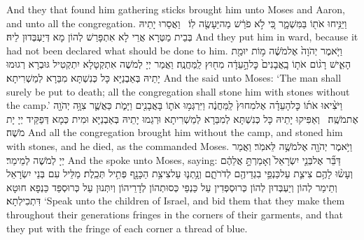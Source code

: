 {And they that found him gathering sticks brought him unto Moses and Aaron, and unto all the congregation.}{}
{וַיַּנִּ֥יחוּ אֹת֖וֹ בַּמִּשְׁמָ֑ר כִּ֚י לֹ֣א פֹרַ֔שׁ מַה\maqqaf יֵּעָשֶׂ֖ה לֽוֹ׃ \setuma }
{וַאֲסַרוּ יָתֵיהּ בְּבֵית מַטְּרָא אֲרֵי לָא אִתְפָּרַשׁ לְהוֹן מָא דְּיַעְבְּדוּן לֵיהּ׃}
{And they put him in ward, because it had not been declared what should be done to him.}{}
{וַיֹּ֤אמֶר יְהֹוָה֙ אֶל\maqqaf מֹשֶׁ֔ה מ֥וֹת יוּמַ֖ת הָאִ֑ישׁ רָג֨וֹם אֹת֤וֹ בָֽאֲבָנִים֙ כׇּל\maqqaf הָ֣עֵדָ֔ה מִח֖וּץ לַֽמַּחֲנֶֽה׃}
{וַאֲמַר יְיָ לְמֹשֶׁה אִתְקְטָלָא יִתְקְטִיל גּוּבְרָא רְגוּמוּ יָתֵיהּ בְּאַבְנַיָּא כָּל כְּנִשְׁתָּא מִבַּרָא לְמַשְׁרִיתָא׃}
{And the \lord\space said unto Moses: ‘The man shall surely be put to death; all the congregation shall stone him with stones without the camp.’}{}
{וַיֹּצִ֨יאוּ אֹת֜וֹ כׇּל\maqqaf הָעֵדָ֗ה אֶל\maqqaf מִחוּץ֙ לַֽמַּחֲנֶ֔ה וַיִּרְגְּמ֥וּ אֹת֛וֹ בָּאֲבָנִ֖ים וַיָּמֹ֑ת כַּאֲשֶׁ֛ר צִוָּ֥ה יְהֹוָ֖ה אֶת\maqqaf מֹשֶֽׁה׃ \petucha }
{וְאַפִּיקוּ יָתֵיהּ כָּל כְּנִשְׁתָּא לְמִבַּרָא לְמַשְׁרִיתָא וּרְגַמוּ יָתֵיהּ בְּאַבְנַיָּא וּמִית כְּמָא דְּפַקֵּיד יְיָ יָת מֹשֶׁה׃}
{And all the congregation brought him without the camp, and stoned him with stones, and he died, as the \lord\space commanded Moses.}{}
{וַיֹּ֥אמֶר יְהֹוָ֖ה אֶל\maqqaf מֹשֶׁ֥ה לֵּאמֹֽר׃}
{וַאֲמַר יְיָ לְמֹשֶׁה לְמֵימַר׃}
{And the \lord\space spoke unto Moses, saying:}{}
{דַּבֵּ֞ר אֶל\maqqaf בְּנֵ֤י יִשְׂרָאֵל֙ וְאָמַרְתָּ֣ אֲלֵהֶ֔ם וְעָשׂ֨וּ לָהֶ֥ם צִיצִ֛ת עַל\maqqaf כַּנְפֵ֥י בִגְדֵיהֶ֖ם לְדֹרֹתָ֑ם וְנָ֥תְנ֛וּ עַל\maqqaf צִיצִ֥ת הַכָּנָ֖ף פְּתִ֥יל תְּכֵֽלֶת׃}
{מַלֵּיל עִם בְּנֵי יִשְׂרָאֵל וְתֵימַר לְהוֹן וְיַעְבְּדוּן לְהוֹן כְּרוּסְפְּדִין עַל כַּנְפֵי כְּסוּתְהוֹן לְדָרֵיהוֹן וְיִתְּנוּן עַל כְּרוּסְפַּד כַּנְפָא חוּטָא דִּתְכִילְתָא׃}
{‘Speak unto the children of Israel, and bid them that they make them throughout their generations fringes in the corners of their garments, and that they put with the fringe of each corner a thread of blue.}{}
